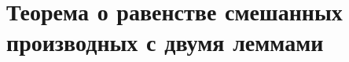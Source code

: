\documentclass[../main.tex]{subfiles}
\begin{document}
\newpage
\section{Теорема о равенстве смешанных производных с двумя леммами}
\end{document}
